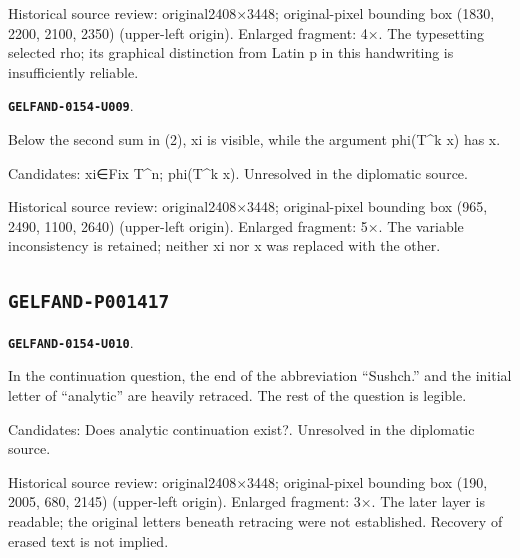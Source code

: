 \documentclass[11pt]{article}
\theoremstyle{definition}
\theoremstyle{remark}
\begin{document}
Historical source review: original2408×3448; original-pixel bounding box (1830, 2200, 2100, 2350) (upper-left origin). Enlarged fragment: 4×. The typesetting selected rho; its graphical distinction from Latin p in this handwriting is insufficiently reliable.\par\medskip
\par\noindent\leavevmode{}\label{GELFAND-0154-U009}\label{GELFAND-P001416:eq2-variable:note}\textbf{\texttt{GELFAND-0154-U009}}.\nopagebreak[4]\par
Below the second sum in (2), xi is visible, while the argument phi(T\textasciicircum{}k x) has x.\par
Candidates: xi∈Fix T\textasciicircum{}n; phi(T\textasciicircum{}k x). Unresolved in the diplomatic source.\par
Historical source review: original2408×3448; original-pixel bounding box (965, 2490, 1100, 2640) (upper-left origin). Enlarged fragment: 5×. The variable inconsistency is retained; neither xi nor x was replaced with the other.\par\medskip
\subsection*{\texttt{GELFAND-P001417}}
\par\noindent\leavevmode{}\label{GELFAND-0154-U010}\label{GELFAND-P001417:continuation-question-overwriting:note}\textbf{\texttt{GELFAND-0154-U010}}.\nopagebreak[4]\par
In the continuation question, the end of the abbreviation “Sushch.” and the initial letter of “analytic” are heavily retraced. The rest of the question is legible.\par
Candidates: Does analytic continuation exist?. Unresolved in the diplomatic source.\par
Historical source review: original2408×3448; original-pixel bounding box (190, 2005, 680, 2145) (upper-left origin). Enlarged fragment: 3×. The later layer is readable; the original letters beneath retracing were not established. Recovery of erased text is not implied.\par\medskip
\end{document}
